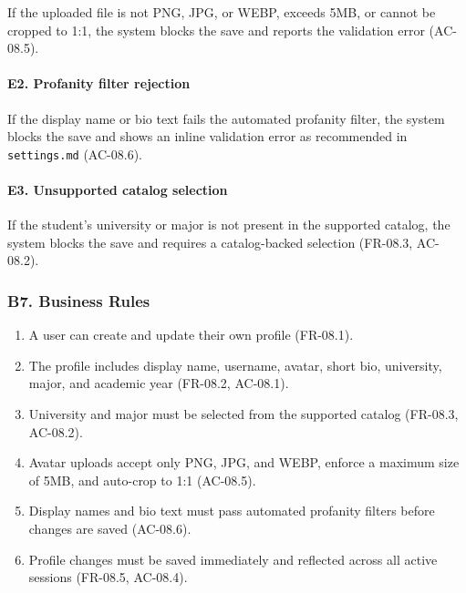 \documentclass[12pt]{article}
\begin{document}
If the uploaded file is not PNG, JPG, or WEBP, exceeds 5MB, or cannot be cropped to 1:1, the system blocks the save and reports the validation error (AC-08.5).
\par\medskip

\hypertarget{sec:e2-profanity-filter-rejection}{}
\paragraph*{E2. Profanity filter rejection}
\par\medskip

If the display name or bio text fails the automated profanity filter, the system blocks the save and shows an inline validation error as recommended in \texttt{settings.md} (AC-08.6).
\par\medskip

\hypertarget{sec:e3-unsupported-catalog-selection}{}
\paragraph*{E3. Unsupported catalog selection}
\par\medskip

If the student's university or major is not present in the supported catalog, the system blocks the save and requires a catalog-backed selection (FR-08.3, AC-08.2).
\par\medskip

\hypertarget{sec:b7-business-rules}{}
\subsubsection*{B7. Business Rules}
\par\medskip

\begin{enumerate}
\item A user can create and update their own profile (FR-08.1).
\item The profile includes display name, username, avatar, short bio, university, major, and academic year (FR-08.2, AC-08.1).
\item University and major must be selected from the supported catalog (FR-08.3, AC-08.2).
\item Avatar uploads accept only PNG, JPG, and WEBP, enforce a maximum size of 5MB, and auto-crop to 1:1 (AC-08.5).
\item Display names and bio text must pass automated profanity filters before changes are saved (AC-08.6).
\item Profile changes must be saved immediately and reflected across all active sessions (FR-08.5, AC-08.4).
\end{enumerate}
\par\medskip
\end{document}
